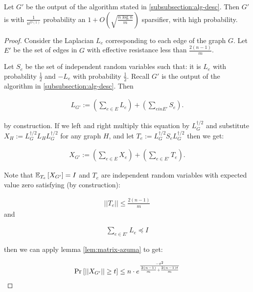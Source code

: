   \begin{lemma} Let $G'$ be the output of the algorithm stated in
  \ref{subsubsection:alg-desc}. Then $G'$ is with $\frac{1}{n^{O(1)}}$ probability an $1+O\left(\sqrt{\frac{n \log n}{m}}\right)$ sparsifier, with high probability. \end{lemma}
    \begin{proof}
      Consider the Laplacian $L_e$ corresponding to each edge of the graph $G$. Let
      $E'$ be the set of edges in $G$ with effective resistance less than
      $\frac{2(n-1)}{m}$.
      
      Let $S_e$ be the set of independent random variables such that: it is
      $L_e$ with probability $\frac{1}{2}$ and $-L_e$ with probability
      $\frac{1}{2}$. Recall $G'$ is the output of the algorithm in
      \ref{subsubsection:alg-desc}. Then 

      \begin{align}
        L_{G'} := \left(\sum_{e \in E} L_e \right) + \left(\sum_{e in E'}
      S_e\right).
      \end{align}

      by construction. If we left and right multiply this equation by $L_G^{\dag/2}$ and
      substitute $X_{H} := L_G^{\dag/2} L_{H} L_G^{\dag/2}$ for any graph $H$,
      and let $T_e := L_G^{\dag/2} S_{e} L_G^{\dag/2}$ then we
      get: 

      \begin{align}
      X_{G'} := \left(\sum_{e \in E} X_e\right) + \left(\sum_{e \in E'}
      T_e\right).
      \end{align}

      Note that ${\mathbb{E}}_{T_e}\left[ X_{G'} \right] = I$ and $T_e$ are independent random
      variables with expected value zero satisfying (by construction):

      \begin{align}
      ||T_e|| \leq \frac{2(n-1)}{m}
      \end{align}
      and 


      \begin{align}
      \sum_{e \in E'} L_e \preceq I
      \end{align}

      then we can apply lemma \ref{lem:matrix-azuma} to get:

      \begin{align}
      \mbox{Pr}_{}\left[ ||X_{G'} || \geq t \right] \leq n \cdot
      e^{\frac{-t^2}{\frac{2(n-1)}{m} + \frac{2(n-1)t}{m}}}
      \end{align}


\end{proof}
